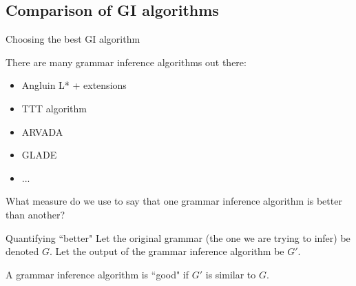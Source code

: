 \documentclass{beamer}
\begin{document}
	\subsection{Comparison of GI algorithms}
	
	\begin{frame}{Choosing the best GI algorithm}

		There are many grammar inference algorithms out there:
		\begin{itemize}
			\item Angluin L* + extensions
			\item TTT algorithm
			\item ARVADA
			\item GLADE
			\item ...
		\end{itemize}

		What measure do we use to say that one grammar inference algorithm is better than another?

	\end{frame}

	\begin{frame}{Quantifying ``better"}
		Let the original grammar (the one we are trying to infer) be denoted $G$. Let the output of the grammar inference algorithm be $G'$.

		\begin{fact}
			A grammar inference algorithm is ``good" if $G'$ is \alert{similar} to $G$.
		\end{fact}
	\end{frame}
\end{document}
